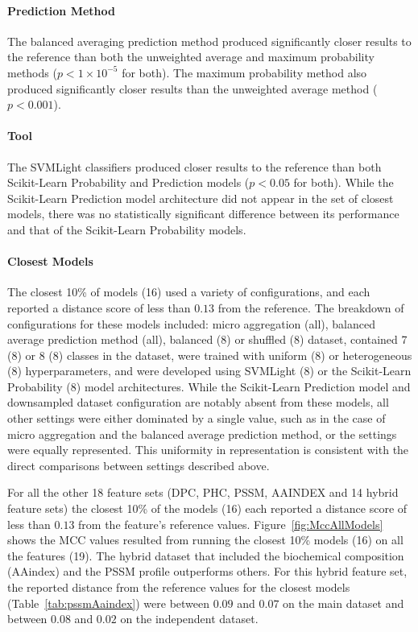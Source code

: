 \paragraph{Prediction Method}
The balanced averaging prediction method produced significantly closer results to the reference than both the
unweighted average and maximum probability methods ($p < 1\times 10^{-5}$ for both). The maximum probability method
also produced significantly closer results than the unweighted average method ($p < 0.001$).

\paragraph{Tool}
The SVMLight classifiers produced closer results to the reference than both Scikit-Learn Probability and Prediction models
($p < 0.05$ for both). While the Scikit-Learn Prediction model architecture did not appear in the set of closest models,
there was no statistically significant difference between its performance and that of the Scikit-Learn Probability models.

\paragraph{Closest Models}
The closest 10\% of models (16) used a variety of configurations, and each reported a distance score of less than
$0.13$ from the reference. The breakdown of configurations for these models included: micro aggregation (all), balanced
average prediction method (all), balanced (8) or shuffled (8) dataset, contained 7 (8) or 8 (8) classes in the dataset,
were trained with uniform (8) or heterogeneous (8) hyperparameters, and were developed using SVMLight (8) or the
Scikit-Learn Probability (8) model architectures. While the Scikit-Learn Prediction model and downsampled dataset configuration
are notably absent from these models, all other settings were either dominated by a single value, such as in the case
of micro aggregation and the balanced average prediction method, or the settings were equally represented. This
uniformity in representation is consistent with the direct comparisons between settings described above.

For all the other 18 feature sets (DPC, PHC, PSSM, AAINDEX and 14 hybrid feature sets) the closest 10\% of the models (16) 
each reported a distance score of less than $0.13$ from the feature's reference values. 
Figure~\ref{fig:MccAllModels} shows the MCC values resulted from running 
the closest 10\% models (16) on all the features (19). 
The hybrid dataset that included the biochemical composition (AAindex) and the PSSM profile 
outperforms others. For this hybrid feature set, the reported distance from the reference values 
for the closest models (Table~\ref{tab:pssmAaindex}) 
were between $0.09$ and $0.07$ on the main dataset and between $0.08$ and $0.02$ on the independent dataset.

